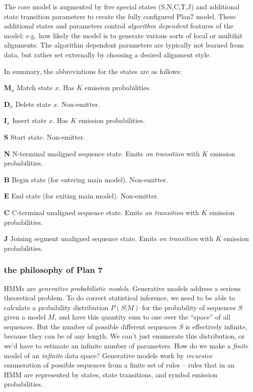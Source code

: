 The core model is augmented by five special states (S,N,C,T,J) and
additional state transition parameters to create the fully configured
Plan7 model. These additional states and parameters control
\textit{algorithm dependent} features of the model: e.g. how likely
the model is to generate various sorts of local or multihit
alignments. The algorithm dependent parameters are typically not
learned from data, but rather set externally by choosing a desired
alignment style.

In summary, the abbreviations for the states are as follows:

\begin{wideitem}
\item [\textbf{M$_x$}] Match state $x$.  Has $K$ emission probabilities.
\item [\textbf{D$_x$}] Delete state $x$. Non-emitter.
\item [\textbf{I$_x$}] Insert state $x$. Has $K$ emission probabilities.
\item [\textbf{S}]     Start state. Non-emitter.
\item [\textbf{N}]     N-terminal unaligned sequence state. 
    Emits \textit{on transition} with $K$ emission probabilities.
\item [\textbf{B}]     Begin state (for entering main model). Non-emitter.
\item [\textbf{E}]     End state (for exiting main model). Non-emitter.
\item [\textbf{C}]     C-terminal unaligned sequence state.
    Emits \textit{on transition} with $K$ emission probabilities.
\item [\textbf{J}]     Joining segment unaligned sequence state.
    Emits \textit{on transition} with $K$ emission probabilities.
\end{wideitem}

\subsubsection{the philosophy of Plan 7}

HMMs are \emph{generative probabilistic models}. Generative models
address a serious theoretical problem. To do correct statistical
inference, we need to be able to calculate a probability distribution
$P(S | M)$ for the probability of sequences $S$ given a model $M$, and
have this quantity sum to one over the ``space'' of all sequences.
But the number of possible different sequences $S$ is effectively
infinite, because they can be of any length. We can't just enumerate
this distribution, or we'd have to estimate an infinite number of
parameters. How do we make a \emph{finite} model of an \emph{infinite}
data space?  Generative models work by \emph{recursive} enumeration of
possible sequences from a finite set of rules -- rules that in an HMM
are represented by states, state transitions, and symbol emission
probabilities.

